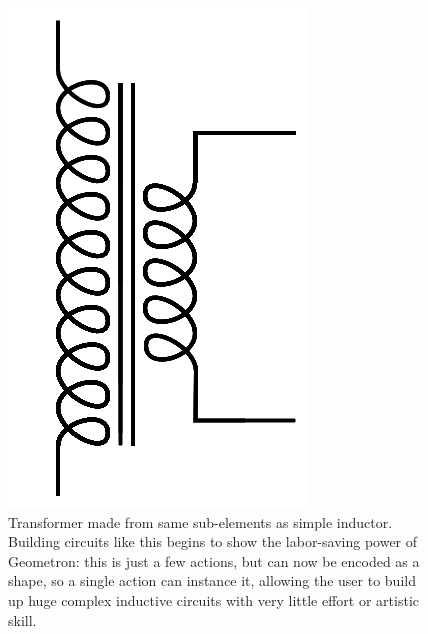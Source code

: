 \documentclass[11pt]{article}
\begin{document}
\begin{figure}

\includegraphics[width=\linewidth]{figures/figure20_transformer.png}

\caption{Transformer made from same sub-elements as simple inductor.  Building circuits like this begins to show the labor-saving power of Geometron: this is just a few actions, but can now be encoded as a shape, so a single action can instance it, allowing the user to build up huge complex inductive circuits with very little effort or artistic skill. }
\end{figure}
\end{document}
